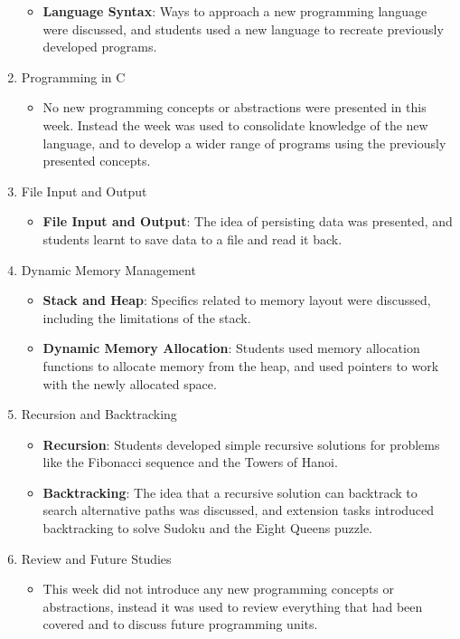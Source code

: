 \begin{enumerate}
  \begin{itemize}[noitemsep,nolistsep]
  	\item \textbf{Language Syntax}: Ways to approach a new programming language were discussed, and students used a new language to recreate previously developed programs.
  \end{itemize}
  \item Programming in C
  \begin{itemize}[noitemsep,nolistsep]
  	\item No new programming concepts or abstractions were presented in this week. Instead the week was used to consolidate knowledge of the new language, and to develop a wider range of programs using the previously presented concepts.
  \end{itemize}
  \item File Input and Output
  \begin{itemize}[noitemsep,nolistsep]
  	\item \textbf{File Input and Output}: The idea of persisting data was presented, and students learnt to save data to a file and read it back. 
  \end{itemize}

  \item Dynamic Memory Management
  \begin{itemize}[noitemsep,nolistsep]
  	\item \textbf{Stack and Heap}: Specifics related to memory layout were discussed, including the limitations of the stack.
  	\item \textbf{Dynamic Memory Allocation}: Students used memory allocation functions to allocate memory from the heap, and used pointers to work with the newly allocated space.
  \end{itemize}

  \item Recursion and Backtracking
  \begin{itemize}[noitemsep,nolistsep]
  	\item \textbf{Recursion}: Students developed simple recursive solutions for problems like the Fibonacci sequence and the Towers of Hanoi.
  	\item \textbf{Backtracking}: The idea that a recursive solution can backtrack to search alternative paths was discussed, and extension tasks introduced backtracking to solve Sudoku and the Eight Queens puzzle.
  \end{itemize}

  \item Review and Future Studies
  \begin{itemize}[noitemsep,nolistsep]
  	\item This week did not introduce any new programming concepts or abstractions, instead it was used to review everything that had been covered and to discuss future programming units.
  \end{itemize}
\end{enumerate}

